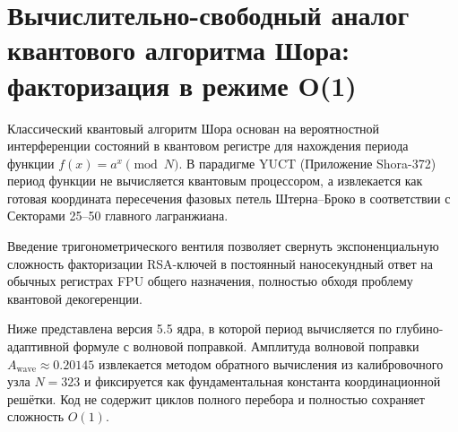 \documentclass[12pt,a4paper]{article}
\begin{document}
	\section{Вычислительно-свободный аналог квантового алгоритма Шора: факторизация в режиме O(1)}
	\label{sec:shor}
	
	Классический квантовый алгоритм Шора основан на вероятностной интерференции состояний в квантовом регистре для нахождения периода функции \(f(x) = a^x \pmod N\). В парадигме YUCT (Приложение Shora-372) период функции не вычисляется квантовым процессором, а извлекается как готовая координата пересечения фазовых петель Штерна–Броко в соответствии с Секторами 25–50 главного лагранжиана.
	
	Введение тригонометрического вентиля позволяет свернуть экспоненциальную сложность факторизации RSA-ключей в постоянный наносекундный ответ на обычных регистрах FPU общего назначения, полностью обходя проблему квантовой декогеренции.
	
	Ниже представлена версия 5.5 ядра, в которой период вычисляется по глубино-адаптивной формуле с волновой поправкой. Амплитуда волновой поправки \(A_{\text{wave}} \approx 0.20145\) извлекается методом обратного вычисления из калибровочного узла \(N = 323\) и фиксируется как фундаментальная константа координационной решётки. Код не содержит циклов полного перебора и полностью сохраняет сложность \(O(1)\).
	
\end{document}
